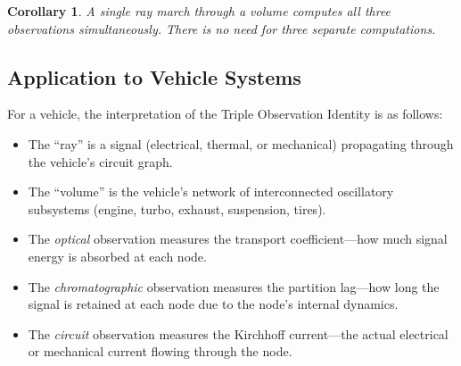 \documentclass[11pt,twocolumn,a4paper]{article}
\newtheorem{corollary}[theorem]{Corollary}
\theoremstyle{definition}
\theoremstyle{remark}
\begin{document}
\begin{corollary}\label{cor:single-ray-march}
A single ray march through a volume computes all three observations simultaneously.  There is no need for three separate computations.
\end{corollary}

\subsection{Application to Vehicle Systems}

For a vehicle, the interpretation of the Triple Observation Identity is as follows:
\begin{itemize}
    \item The ``ray'' is a signal (electrical, thermal, or mechanical) propagating through the vehicle's circuit graph.
    \item The ``volume'' is the vehicle's network of interconnected oscillatory subsystems (engine, turbo, exhaust, suspension, tires).
    \item The \emph{optical} observation measures the transport coefficient---how much signal energy is absorbed at each node.
    \item The \emph{chromatographic} observation measures the partition lag---how long the signal is retained at each node due to the node's internal dynamics.
    \item The \emph{circuit} observation measures the Kirchhoff current---the actual electrical or mechanical current flowing through the node.
\end{itemize}
\end{document}
